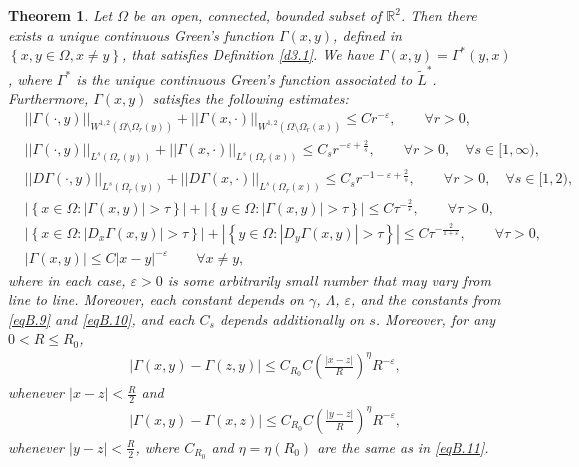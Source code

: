 \documentclass[12pt,reqno]{amsart}
\theoremstyle{plain}
\newtheorem{thm}{Theorem}
\theoremstyle{definition}
\newcommand{\eps}{\varepsilon}
\newcommand{\ga}{\gamma}
\newcommand{\Ga}{\Gamma}
\newcommand{\La}{\Lambda}
\newcommand{\Om}{\Omega}
\newcommand{\iny}{\infty}
\newcommand{\norm}[1]{\left\vert \left\vert #1\right\vert\right\vert}
\newcommand{\abs}[1]{\left\vert#1\right\vert}
\newcommand{\set}[1]{\left\{#1\right\}}
\newcommand{\pr}[1]{\left( #1 \right) }
\newcommand{\R}{\ensuremath{\mathbb{R}}}
\begin{document}
\begin{appendix}
\begin{thm}
\label{t3.2} 
Let $\Om$ be an open, connected, bounded subset of $\R^2$.  
Then there exists a unique continuous Green's function $\Ga(x,y)$, defined in $\set{x,y\in \Om, x\neq y}$, that satisfies Definition \ref{d3.1}.  
We have $\Ga(x,y)=\Ga^*(y,x)$, where $\Ga^*$ is the unique continuous Green's function associated to $\widetilde{L}^*$.  
Furthermore, $\Ga(x,y)$ satisfies the following estimates:
\begin{align}
& \norm{\Ga\pr{\cdot, y}}_{W^{1,2}\pr{\Om \setminus \Om_r\pr{y}}}
+\norm{\Ga\pr{x,\cdot}}_{W^{1,2}\pr{\Om \setminus \Om_r\pr{x}}} 
\le C r^{-\eps}, \qquad \forall r>0,
\label{eqB.16} \\
& \norm{\Ga\pr{\cdot, y}}_{L^{s}\pr{\Om_r\pr{y}}}
+\norm{\Ga\pr{x,\cdot}}_{L^{s}\pr{\Om_r\pr{x}}} 
\le C_s r^{- \eps+ \frac{2}{s}}, \qquad \forall r>0, \quad \forall s \in [1,\iny),
\label{eqB.17} \\
& \norm{D \Ga\pr{\cdot, y}}_{L^{s}\pr{\Om_r\pr{y}}}
+\norm{D \Ga\pr{x,\cdot}}_{L^{s}\pr{\Om_r\pr{x}}} 
\le C_s r^{-1-\eps +\frac{2}{s}}, \qquad \forall r>0, \quad \forall s \in [ 1, 2), 
\label{eqB.18} \\
& \abs{\set{x \in \Om : \abs{\Ga\pr{x,y}} > \tau }}
+\abs{\set{y \in \Om : \abs{\Ga\pr{x,y}} > \tau }} 
\le C \tau^{- \frac{2}{\eps}}, \qquad \forall \tau >0,
\label{eqB.19} \\
& \abs{\set{x \in \Om : \abs{D_x \Ga\pr{x,y}} > \tau }}
+\abs{\set{y \in \Om : \abs{D_y \Ga\pr{x,y}} > \tau }} 
\le C \tau^{- \frac{2}{1+\eps}}, \qquad \forall \tau >0,
\label{eqB.20} \\
& \abs{\Ga\pr{x,y}} \le C |x-y|^{-\eps} \qquad \forall x \ne y,
\label{eqB.21} 
\end{align}
where in each case, $\eps > 0$ is some arbitrarily small number that may vary from line to line.
Moreover, each constant depends on $\ga$, $\La$, $\eps$, and the constants from \eqref{eqB.9} and \eqref{eqB.10}, and each $C_s$ depends additionally on $s$.
Moreover, for any $0<R\le R_0$,
\begin{align}
& \abs{\Ga\pr{x,y} - \Ga\pr{z,y}} 
\le C_{R_0} C \pr{\frac{|x-z|}{R}}^\eta R^{-\eps},
\label{eqB.22}
\end{align}
whenever $|x-z|<\frac{R}{2}$ and
\begin{align}
& \abs{\Ga\pr{x,y} - \Ga\pr{x,z}} 
\le C_{R_0} C \pr{\frac{|y-z|}{R}}^\eta R^{-\eps},
\label{eqB.23}
\end{align}
whenever $|y-z|<\frac{R}{2}$, where $C_{R_0}$ and $\eta=\eta(R_0)$ are the same as in \eqref{eqB.11}.
\end{thm}


\end{appendix}
\end{document}
